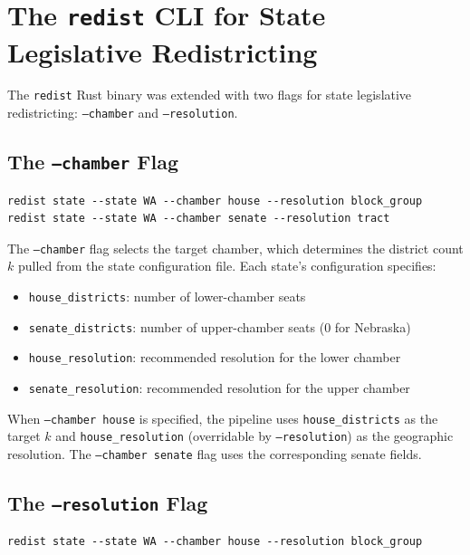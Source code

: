 \section{The \texttt{redist} CLI for State Legislative Redistricting}
\label{sec:cli}

The \texttt{redist} Rust binary was extended with two flags for state legislative
redistricting: \texttt{--chamber} and \texttt{--resolution}.

\subsection{The \texttt{--chamber} Flag}
\label{sec:cli:chamber}

\begin{verbatim}
redist state --state WA --chamber house --resolution block_group
redist state --state WA --chamber senate --resolution tract
\end{verbatim}

The \texttt{--chamber} flag selects the target chamber, which determines the
district count $k$ pulled from the state configuration file. Each state's
configuration specifies:
\begin{itemize}
  \item \texttt{house\_districts}: number of lower-chamber seats
  \item \texttt{senate\_districts}: number of upper-chamber seats (0 for Nebraska)
  \item \texttt{house\_resolution}: recommended resolution for the lower chamber
  \item \texttt{senate\_resolution}: recommended resolution for the upper chamber
\end{itemize}

When \texttt{--chamber house} is specified, the pipeline uses
\texttt{house\_districts} as the target $k$ and \texttt{house\_resolution}
(overridable by \texttt{--resolution}) as the geographic resolution.
The \texttt{--chamber senate} flag uses the corresponding senate fields.

\subsection{The \texttt{--resolution} Flag}
\label{sec:cli:resolution}

\begin{verbatim}
redist state --state WA --chamber house --resolution block_group
\end{verbatim}


